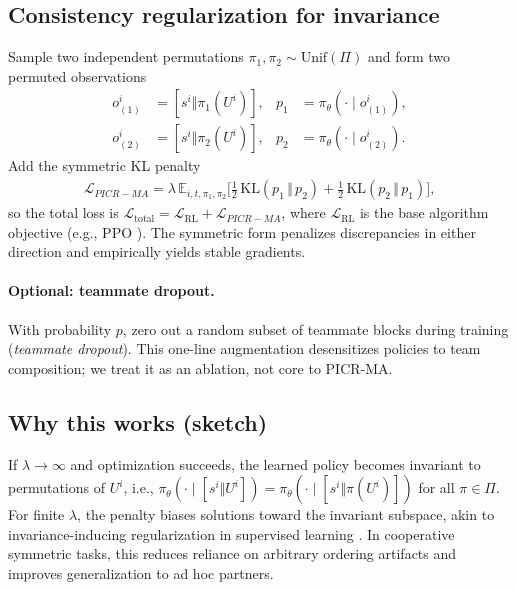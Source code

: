 \documentclass[nohyperref]{article}
\newcommand{\method}{PICR-MA} %
\newcommand{\E}{\mathbb{E}}
\newcommand{\KL}{\mathrm{KL}}
\begin{document}
\subsection{Consistency regularization for invariance}
Sample two independent permutations $\pi_1,\pi_2\sim\mathrm{Unif}(\Pi)$ and form two permuted observations
\begin{align}
    o^{i}_{(1)} &= [s^i\Vert\pi_1(U^i)], & p_1 &= \pi_\theta(\cdot\mid o^i_{(1)}),\\
    o^{i}_{(2)} &= [s^i\Vert\pi_2(U^i)], & p_2 &= \pi_\theta(\cdot\mid o^i_{(2)}).
\end{align}
Add the symmetric KL penalty
\begin{align}
\mathcal{L}_{\method} = \lambda\, \E_{i,t,\pi_1,\pi_2} \Big[ \tfrac{1}{2}\,\KL(p_1\,\Vert\,p_2) + \tfrac{1}{2}\,\KL(p_2\,\Vert\,p_1) \Big],
\end{align}
so the total loss is $\mathcal{L}_{\text{total}} = \mathcal{L}_{\text{RL}} + \mathcal{L}_{\method}$, where $\mathcal{L}_{\text{RL}}$ is the base algorithm objective (e.g., PPO \citep{schulman2017ppo}). The symmetric form penalizes discrepancies in either direction and empirically yields stable gradients.

\paragraph{Optional: teammate dropout.} With probability $p$, zero out a random subset of teammate blocks during training (\emph{teammate dropout}). This one-line augmentation desensitizes policies to team composition; we treat it as an ablation, not core to \method.

\subsection{Why this works (sketch)}
If $\lambda\to\infty$ and optimization succeeds, the learned policy becomes invariant to permutations of $U^i$, i.e., $\pi_\theta(\cdot\mid[s^i\Vert U^i]) = \pi_\theta(\cdot\mid[s^i\Vert\pi(U^i)])$ for all $\pi\in\Pi$. For finite $\lambda$, the penalty biases solutions toward the invariant subspace, akin to invariance-inducing regularization in supervised learning \citep{tarvainen2017meanteacher, sohn2020fixmatch}. In cooperative symmetric tasks, this reduces reliance on arbitrary ordering artifacts and improves generalization to ad hoc partners.
\end{document}
